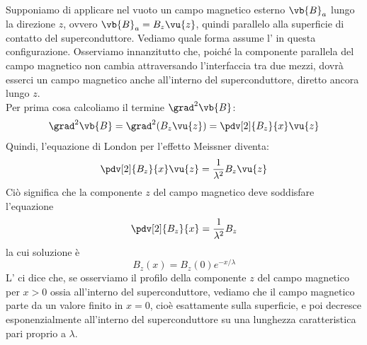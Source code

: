 \hspace{-0.6cm}Supponiamo di applicare nel vuoto un campo magnetico esterno $\vb{B}_a$ lungo la direzione $z$, ovvero $\vb{B}_a=B_z \vu{z}$, quindi parallelo alla superficie di contatto del superconduttore. Vediamo quale forma assume l' in questa configurazione. Osserviamo innanzitutto che, poiché la componente parallela del campo magnetico non cambia attraversando l'interfaccia tra due mezzi, dovrà esserci un campo magnetico anche all'interno del superconduttore, diretto ancora lungo $z$.\\
Per prima cosa calcoliamo il termine $\grad^2 \vb{B}$:
\begin{equation*}
   \grad^2 \vb{B}
   = \grad^2 (B_z \vu{z})
   = \pdv[2]{B_z}{x} \vu{z}
\end{equation*}
Quindi, l'equazione di London per l'effetto Meissner diventa:
\begin{equation*}
   \pdv[2]{B_z}{x} \vu{z}
   =\frac{1}{\lambda^2} B_z \vu{z}
\end{equation*}
Ciò significa che la componente $z$ del campo magnetico deve soddisfare l'equazione
\begin{equation*}
   \pdv[2]{B_z}{x}
   =\frac{1}{\lambda^2} B_z
\end{equation*}
la cui soluzione è
\begin{equation}
   B_z(x)
   =B_z(0) e^{-x/\lambda}
   \label{eq:campo_magnetico_dentro_il_superconduttore}
\end{equation}
L' ci dice che, se osserviamo il profilo della componente $z$ del campo magnetico per $x>0$ ossia all'interno del superconduttore, vediamo che il campo magnetico parte da un valore finito in $x=0$, cioè esattamente sulla superficie, e poi decresce esponenzialmente all'interno del superconduttore su una lunghezza caratteristica pari proprio a $\lambda$.\\
\begin{marginfigure}
   \centering
   \caption*{Comportamento del campo magnetico all'interno di un superconduttore, in prossimità del bordo.}
\end{marginfigure}
